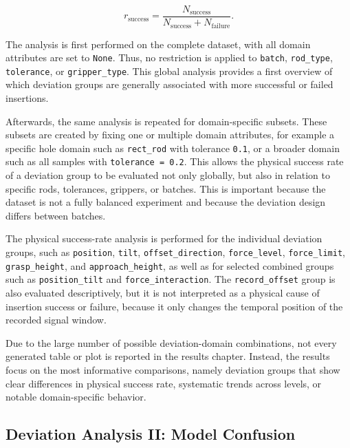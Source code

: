 \begin{equation}
    r_\mathrm{success}
    =
    \frac{N_\mathrm{success}}
    {N_\mathrm{success} + N_\mathrm{failure}} .
    \label{eq:physical_success_rate}
\end{equation}

The analysis is first performed on the complete dataset, with all domain attributes are set to \texttt{None}. Thus, no restriction is applied to \texttt{batch}, \texttt{rod\_type}, \texttt{tolerance}, or \texttt{gripper\_type}. This global analysis provides a first overview of which deviation groups are generally associated with more successful or failed insertions.

Afterwards, the same analysis is repeated for domain-specific subsets. These subsets are created by fixing one or multiple domain attributes, for example a specific hole domain such as \texttt{rect\_rod} with tolerance \texttt{0.1}, or a broader domain such as all samples with \texttt{tolerance = 0.2}. This allows the physical success rate of a deviation group to be evaluated not only globally, but also in relation to specific rods, tolerances, grippers, or batches. This is important because the dataset is not a fully balanced experiment and because the deviation design differs between batches.

The physical success-rate analysis is performed for the individual deviation groups, such as \texttt{position}, \texttt{tilt}, \texttt{offset\_direction}, \texttt{force\_level}, \texttt{force\_limit}, \texttt{grasp\_height}, and \texttt{approach\_height}, as well as for selected combined groups such as \texttt{position\_tilt} and \texttt{force\_interaction}. The \texttt{record\_offset} group is also evaluated descriptively, but it is not interpreted as a physical cause of insertion success or failure, because it only changes the temporal position of the recorded signal window.

Due to the large number of possible deviation-domain combinations, not every generated table or plot is reported in the results chapter. Instead, the results focus on the most informative comparisons, namely deviation groups that show clear differences in physical success rate, systematic trends across levels, or notable domain-specific behavior.

\subsection{Deviation Analysis II: Model Confusion}
\label{sec:deviation_analysis_model_confusion}

